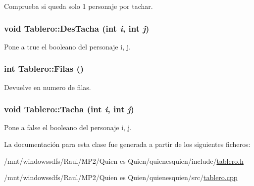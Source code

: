 Comprueba si queda solo 1 personaje por tachar. 

\hypertarget{class_tablero_8a6fc4d7e1a9603f4087f7e83bce75e7}{
\subsubsection[{DesTacha}]{\setlength{\rightskip}{0pt plus 5cm}void Tablero::DesTacha (int {\em i}, \/  int {\em j})}}
\label{class_tablero_8a6fc4d7e1a9603f4087f7e83bce75e7}


Pone a true el booleano del personaje i, j. 

\hypertarget{class_tablero_b1fc381f5d873e528c1c63f97e6e3ba9}{
\subsubsection[{Filas}]{\setlength{\rightskip}{0pt plus 5cm}int Tablero::Filas ()}}
\label{class_tablero_b1fc381f5d873e528c1c63f97e6e3ba9}


Devuelve en numero de filas. 

\hypertarget{class_tablero_0e4792c5222238268314606d1ef09ef2}{
\subsubsection[{Tacha}]{\setlength{\rightskip}{0pt plus 5cm}void Tablero::Tacha (int {\em i}, \/  int {\em j})}}
\label{class_tablero_0e4792c5222238268314606d1ef09ef2}


Pone a false el booleano del personaje i, j. 



La documentación para esta clase fue generada a partir de los siguientes ficheros:\begin{CompactItemize}
\item 
/mnt/windowssdfs/Raul/MP2/Quien es Quien/quienesquien/include/\hyperlink{tablero_8h}{tablero.h}\item 
/mnt/windowssdfs/Raul/MP2/Quien es Quien/quienesquien/src/\hyperlink{tablero_8cpp}{tablero.cpp}\end{CompactItemize}
